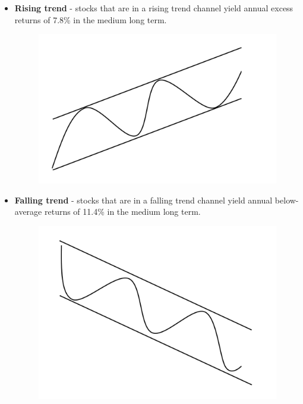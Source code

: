 \begin{itemize}
  \item \textbf{Rising trend} - stocks that are in a rising trend channel yield annual excess returns of 7.8\% in the medium long term.
\begin{figure}[H]
\centering
\includegraphics [scale=0.20,angle=360]{figures/trendup.png}
\label{fig:trendup}
\end{figure}
  \item \textbf{Falling trend} - stocks that are in a falling trend channel yield annual below-average returns of 11.4\% in the medium long term.
\begin{figure}[H]
\centering
\includegraphics [scale=0.20,angle=360]{figures/trenddown.png}
\label{fig:trenddown}
\end{figure}

\end{itemize}
